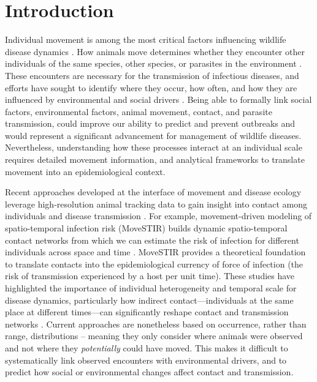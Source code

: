 \documentclass[letterpaper]{article}
\begin{document}
\section*{Introduction}

Individual movement is among the most critical factors influencing wildlife disease dynamics \citep{Dougherty2018,Manlove2022}. 
How animals move determines whether they encounter other individuals of the same species, other species, or parasites in the environment \citep{Martinez-Garcia2020,Das2023}. 
These encounters are necessary for the transmission of infectious diseases, and efforts have sought to identify where they occur, how often, and how they are influenced by environmental and social drivers \citep{Titcomb2021,Dougherty2022,Webber2023}. 
Being able to formally link social factors, environmental factors, animal movement, contact, and parasite transmission, could improve our ability to predict and prevent outbreaks and would represent a significant advancement for management of wildlife diseases.  
Nevertheless, understanding how these processes interact at an individual scale requires detailed movement information, and analytical frameworks to translate movement into an epidemiological context.

Recent approaches developed at the interface of movement and disease ecology leverage high-resolution animal tracking data to gain insight into contact among individuals and disease transmission \citep{Richardson2015,Wilber2022,Yang2023}. For example, movement-driven modeling of spatio-temporal infection risk (MoveSTIR) builds dynamic spatio-temporal contact networks from which we can estimate the risk of infection for different individuals across space and time \citep{Wilber2022}. MoveSTIR provides a theoretical foundation to translate contacts into the epidemiological currency of force of infection (the risk of transmission experienced by a host per unit time). These studies have highlighted the importance of individual heterogeneity and temporal scale for disease dynamics, particularly how indirect contact---individuals at the same place at different times---can significantly reshape contact and transmission networks \citep{Richardson2015,Yang2023}. Current approaches are nonetheless based on occurrence, rather than range, distributions \citep[in the terminology of ][]{Alston2022} -- meaning they only consider where animals were observed and not where they \emph{potentially} could have moved. This makes it difficult to systematically link observed encounters with environmental drivers, and to predict how social or environmental changes affect contact and transmission. 
\end{document}

